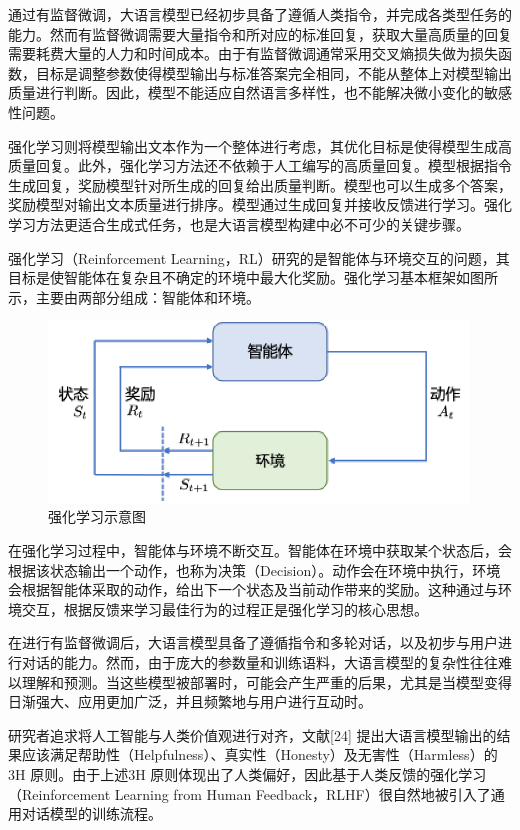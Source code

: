 \documentclass{article} %
\begin{document}
通过有监督微调，大语言模型已经初步具备了遵循人类指令，并完成各类型任务的能力。然而有监督微调需要大量指令和所对应的标准回复，获取大量高质量的回复需要耗费大量的人力和时间成本。由于有监督微调通常采用交叉熵损失做为损失函数，目标是调整参数使得模型输出与标准答案完全相同，不能从整体上对模型输出质量进行判断。因此，模型不能适应自然语言多样性，也不能解决微小变化的敏感性问题。

强化学习则将模型输出文本作为一个整体进行考虑，其优化目标是使得模型生成高质量回复。此外，强化学习方法还不依赖于人工编写的高质量回复。模型根据指令生成回复，奖励模型针对所生成的回复给出质量判断。模型也可以生成多个答案，奖励模型对输出文本质量进行排序。模型通过生成回复并接收反馈进行学习。强化学习方法更适合生成式任务，也是大语言模型构建中必不可少的关键步骤。

强化学习（Reinforcement Learning，RL）研究的是智能体与环境交互的问题，其目标是使智能体在复杂且不确定的环境中最大化奖励。强化学习基本框架如图所示，主要由两部分组成：智能体和环境。
\begin{figure}[h] %
    \centering %
    \includegraphics[width=\textwidth]{强化学习.png} %
    \caption{强化学习示意图} %
    \label{fig:example} %
\end{figure}
\FloatBarrier

在强化学习过程中，智能体与环境不断交互。智能体在环境中获取某个状态后，会根据该状态输出一个动作，也称为决策（Decision）。动作会在环境中执行，环境会根据智能体采取的动作，给出下一个状态及当前动作带来的奖励。这种通过与环境交互，根据反馈来学习最佳行为的过程正是强化学习的核心思想。

在进行有监督微调后，大语言模型具备了遵循指令和多轮对话，以及初步与用户进行对话的能力。然而，由于庞大的参数量和训练语料，大语言模型的复杂性往往难以理解和预测。当这些模型被部署时，可能会产生严重的后果，尤其是当模型变得日渐强大、应用更加广泛，并且频繁地与用户进行互动时。

研究者追求将人工智能与人类价值观进行对齐，文献[24] 提出大语言模型输出的结果应该满足帮助性（Helpfulness）、真实性（Honesty）及无害性（Harmless）的3H 原则。由于上述3H 原则体现出了人类偏好，因此基于人类反馈的强化学习（Reinforcement Learning from Human Feedback，RLHF）很自然地被引入了通用对话模型的训练流程。
\end{document}
